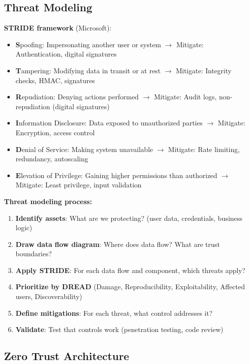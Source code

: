 \documentclass[11pt]{article}
\providecommand{\tightlist}{\setlength{\itemsep}{1pt}\setlength{\parskip}{0pt}}
\begin{document}
\subsection{Threat Modeling}\label{threat-modeling}

\textbf{STRIDE framework} (Microsoft):

\begin{itemize}
\tightlist
\item
  \textbf{S}poofing: Impersonating another user or system \(\rightarrow\) Mitigate: Authentication, digital signatures
\item
  \textbf{T}ampering: Modifying data in transit or at rest \(\rightarrow\) Mitigate: Integrity checks, HMAC, signatures
\item
  \textbf{R}epudiation: Denying actions performed \(\rightarrow\) Mitigate: Audit logs, non-repudiation (digital signatures)
\item
  \textbf{I}nformation Disclosure: Data exposed to unauthorized parties \(\rightarrow\) Mitigate: Encryption, access control
\item
  \textbf{D}enial of Service: Making system unavailable \(\rightarrow\) Mitigate: Rate limiting, redundancy, autoscaling
\item
  \textbf{E}levation of Privilege: Gaining higher permissions than authorized \(\rightarrow\) Mitigate: Least privilege, input validation
\end{itemize}

\textbf{Threat modeling process:}

\begin{enumerate}
\def\labelenumi{\arabic{enumi}.}
\tightlist
\item
  \textbf{Identify assets}: What are we protecting? (user data, credentials, business logic)
\item
  \textbf{Draw data flow diagram}: Where does data flow? What are trust boundaries?
\item
  \textbf{Apply STRIDE}: For each data flow and component, which threats apply?
\item
  \textbf{Prioritize by DREAD} (Damage, Reproducibility, Exploitability, Affected users, Discoverability)
\item
  \textbf{Define mitigations}: For each threat, what control addresses it?
\item
  \textbf{Validate}: Test that controls work (penetration testing, code review)
\end{enumerate}

\subsection{Zero Trust Architecture}\label{zero-trust-architecture}
\end{document}

